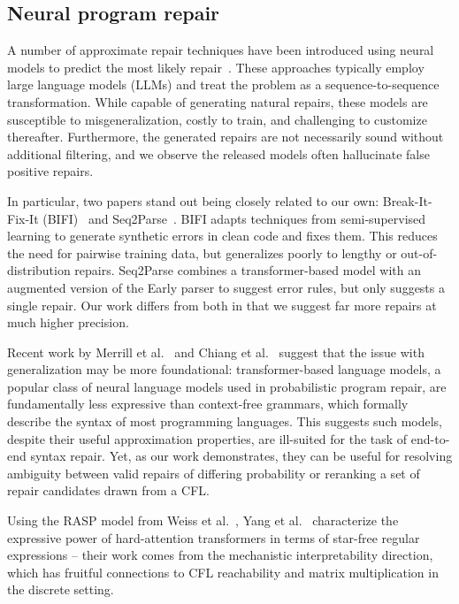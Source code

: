 \documentclass[sigplan,review,acmsmall,nonacm,screen,anonymous]{acmart}\settopmatter{printfolios=false,printccs=false,printacmref=false}
\begin{document}
\subsection{Neural program repair}

A number of approximate repair techniques have been introduced using neural models to predict the most likely repair~\cite{allamanis2021self, chirkova2021empirical, drain2021generating}. These approaches typically employ large language models (LLMs) and treat the problem as a sequence-to-sequence transformation. While capable of generating natural repairs, these models are susceptible to misgeneralization, costly to train, and challenging to customize thereafter. Furthermore, the generated repairs are not necessarily sound without additional filtering, and we observe the released models often hallucinate false positive repairs.

In particular, two papers stand out being closely related to our own: Break-It-Fix-It (BIFI)~\cite{yasunaga2021break} and Seq2Parse~\cite{sakkas2022seq2parse}. BIFI adapts techniques from semi-supervised learning to generate synthetic errors in clean code and fixes them. This reduces the need for pairwise training data, but generalizes poorly to lengthy or out-of-distribution repairs. Seq2Parse combines a transformer-based model with an augmented version of the Early parser to suggest error rules, but only suggests a single repair. Our work differs from both in that we suggest far more repairs at much higher precision.

Recent work by Merrill et al.~\cite{merrill2022saturated} and Chiang et al.~\cite{chiang2023tighter} suggest that the issue with generalization may be more foundational: transformer-based language models, a popular class of neural language models used in probabilistic program repair, are fundamentally less expressive than context-free grammars, which formally describe the syntax of most programming languages. This suggests such models, despite their useful approximation properties, are ill-suited for the task of end-to-end syntax repair. Yet, as our work demonstrates, they can be useful for resolving ambiguity between valid repairs of differing probability or reranking a set of repair candidates drawn from a CFL.

Using the RASP model from Weiss et al.~\cite{weiss2021thinking}, Yang et al.~\cite{yang2024masked} characterize the expressive power of hard-attention transformers in terms of star-free regular expressions -- their work comes from the mechanistic interpretability direction, which has fruitful connections to CFL reachability and matrix multiplication in the discrete setting.
\end{document}
